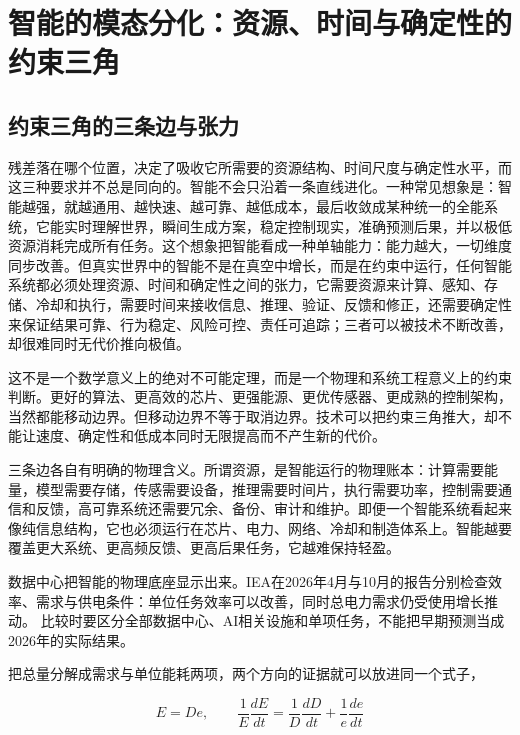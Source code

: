 \section{智能的模态分化：资源、时间与确定性的约束三角}

\subsection{约束三角的三条边与张力}

残差落在哪个位置，决定了吸收它所需要的资源结构、时间尺度与确定性水平，而这三种要求并不总是同向的。智能不会只沿着一条直线进化。一种常见想象是：智能越强，就越通用、越快速、越可靠、越低成本，最后收敛成某种统一的全能系统，它能实时理解世界，瞬间生成方案，稳定控制现实，准确预测后果，并以极低资源消耗完成所有任务。这个想象把智能看成一种单轴能力：能力越大，一切维度同步改善。但真实世界中的智能不是在真空中增长，而是在约束中运行，任何智能系统都必须处理资源、时间和确定性之间的张力，它需要资源来计算、感知、存储、冷却和执行，需要时间来接收信息、推理、验证、反馈和修正，还需要确定性来保证结果可靠、行为稳定、风险可控、责任可追踪；三者可以被技术不断改善，却很难同时无代价推向极值。


这不是一个数学意义上的绝对不可能定理，而是一个物理和系统工程意义上的约束判断。更好的算法、更高效的芯片、更强能源、更优传感器、更成熟的控制架构，当然都能移动边界。但移动边界不等于取消边界。技术可以把约束三角推大，却不能让速度、确定性和低成本同时无限提高而不产生新的代价。

三条边各自有明确的物理含义。所谓资源，是智能运行的物理账本：计算需要能量，模型需要存储，传感需要设备，推理需要时间片，执行需要功率，控制需要通信和反馈，高可靠系统还需要冗余、备份、审计和维护。即便一个智能系统看起来像纯信息结构，它也必须运行在芯片、电力、网络、冷却和制造体系上。智能越要覆盖更大系统、更高频反馈、更高后果任务，它越难保持轻盈。

数据中心把智能的物理底座显示出来。IEA在2026年4月与10月的报告分别检查效率、需求与供电条件：单位任务效率可以改善，同时总电力需求仍受使用增长推动。\cite{iea2026questions,iea2026powering} 比较时要区分全部数据中心、AI相关设施和单项任务，不能把早期预测当成2026年的实际结果。

把总量分解成需求与单位能耗两项，两个方向的证据就可以放进同一个式子，

\begin{equation}
E=De,\qquad \frac{1}{E}\frac{dE}{dt}=\frac{1}{D}\frac{dD}{dt}+\frac{1}{e}\frac{de}{dt}
\end{equation}

